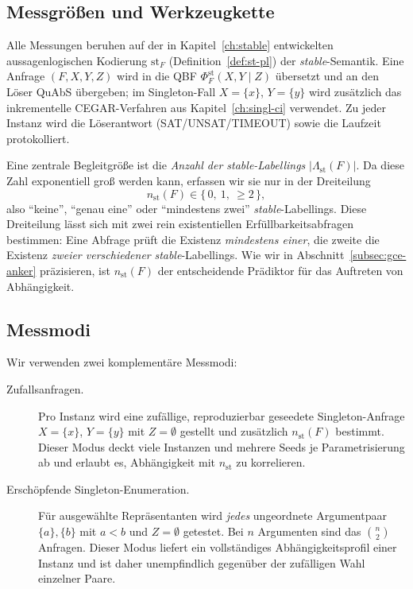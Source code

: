 \subsection{Messgr\"o\ss en und Werkzeugkette}
\label{subsec:gce-werkzeug}

Alle Messungen beruhen auf der in Kapitel~\ref{ch:stable} entwickelten
aussagenlogischen Kodierung \(\mathrm{st}_F\) (Definition~\ref{def:st-pl}) der
\textit{stable}-Semantik. Eine Anfrage \((F,X,Y,Z)\) wird in die QBF
\(\Phi^{\mathrm{st}}_F(X,Y\mid Z)\) \"ubersetzt und an den L\"oser QuAbS
\"ubergeben; im Singleton-Fall \(X=\{x\}\), \(Y=\{y\}\) wird zus\"atzlich das
inkrementelle CEGAR-Verfahren aus Kapitel~\ref{ch:singl-ci} verwendet. Zu
jeder Instanz wird die L\"oserantwort (SAT/UNSAT/TIMEOUT) sowie die Laufzeit
protokolliert.

Eine zentrale Begleitgr\"o\ss e ist die \emph{Anzahl der
\textit{stable}-Labellings} \(|\Lambda_{\mathrm{st}}(F)|\). Da diese Zahl
exponentiell gro\ss{} werden kann, erfassen wir sie nur in der Dreiteilung
\[
    n_{\mathrm{st}}(F)\in\{\,0,\ 1,\ {\geq}2\,\},
\]
also \enquote{keine}, \enquote{genau eine} oder \enquote{mindestens zwei}
\textit{stable}-Labellings. Diese Dreiteilung l\"asst sich mit zwei rein
existentiellen Erf\"ullbarkeitsabfragen bestimmen: Eine Abfrage pr\"uft die
Existenz \emph{mindestens einer}, die zweite die Existenz \emph{zweier
verschiedener} \textit{stable}-Labellings. Wie wir in
Abschnitt~\ref{subsec:gce-anker} pr\"azisieren, ist \(n_{\mathrm{st}}(F)\) der
entscheidende Pr\"adiktor f\"ur das Auftreten von Abh\"angigkeit.

\subsection{Messmodi}
\label{subsec:gce-modi}

Wir verwenden zwei komplement\"are Messmodi:

\begin{description}
    \item[Zufallsanfragen.] Pro Instanz wird eine zuf\"allige, reproduzierbar
    geseedete Singleton-Anfrage \(X=\{x\}\), \(Y=\{y\}\) mit \(Z=\emptyset\)
    gestellt und zus\"atzlich \(n_{\mathrm{st}}(F)\) bestimmt. Dieser Modus
    deckt viele Instanzen und mehrere Seeds je Parametrisierung ab und erlaubt
    es, Abh\"angigkeit mit \(n_{\mathrm{st}}\) zu korrelieren.

    \item[Ersch\"opfende Singleton-Enumeration.] F\"ur ausgew\"ahlte
    Repr\"asentanten wird \emph{jedes} ungeordnete Argumentpaar
    \(\{a\},\{b\}\) mit \(a<b\) und \(Z=\emptyset\) getestet. Bei \(n\)
    Argumenten sind das \(\binom{n}{2}\) Anfragen. Dieser Modus liefert ein
    vollst\"andiges Abh\"angigkeitsprofil einer Instanz und ist daher
    unempfindlich gegen\"uber der zuf\"alligen Wahl einzelner Paare.
\end{description}

